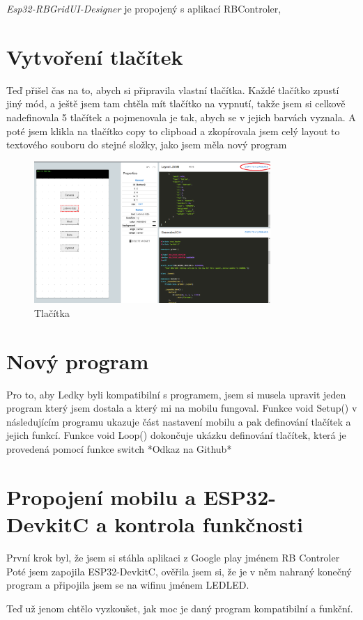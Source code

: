 {\em Esp32-RBGridUI-Designer} je propojený s aplikací RBControler, \cite{RBControler}
\section{Vytvoření tlačítek}
Teď přišel čas na to, abych si připravila vlastní tlačítka. Každé tlačítko zpustí jiný mód, a ještě jsem tam chtěla mít tlačítko na vypnutí, takže jsem si celkově nadefinovala 5 tlačítek a pojmenovala je tak, abych se v jejich barvách vyznala. A poté jsem klikla na tlačítko copy to clipboad a zkopírovala jsem celý layout to textového souboru do stejné složky, jako jsem měla nový program  

\begin{figure}[htbp]
	\centering
	\includegraphics[width=0.8\textwidth]{img/Esp32-RBGridUI-Designer - Tlačítka.png}
	\caption{Tlačítka}
\end{figure}
\section{Nový program} %
Pro to, aby Ledky byli kompatibilní s programem, jsem si musela upravit jeden program který jsem dostala a který mi na mobilu fungoval. %
Funkce void Setup() v následujícím programu ukazuje část nastavení mobilu a pak definování tlačítek a jejich funkcí. Funkce void Loop() dokončuje ukázku definování tlačítek, která je provedená pomocí funkce switch
*Odkaz na Github*






\section{Propojení mobilu a ESP32-DevkitC a kontrola funkčnosti}
První krok byl, že jsem si stáhla aplikaci z Google play jménem RB Controler %
Poté jsem zapojila ESP32-DevkitC, ověřila jsem si, že je v něm nahraný konečný program a připojila jsem se na wifinu jménem LEDLED. 


Teď už jenom chtělo vyzkoušet, jak moc je daný program kompatibilní a funkční. %

\newpage
